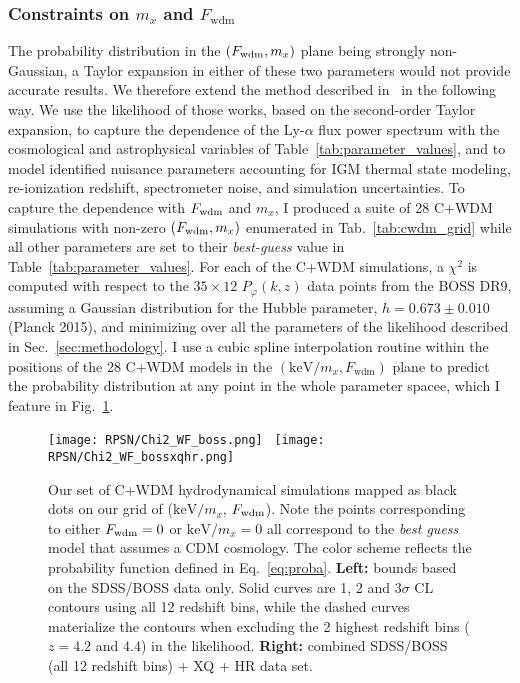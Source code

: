\subsubsection{Constraints on $m_x$ and $F_{\mathrm{wdm}}$}

The probability distribution in the $(F_{\rm{wdm}},m_x)$ plane  being strongly non-Gaussian, a Taylor expansion in either of these two parameters would not provide  accurate results. We therefore extend the method described in~\cite{Borde2014, Palanque2015a, Palanque2015b, Baur16} in the following way. We use the likelihood of those works, based on the second-order Taylor expansion, to capture the dependence  of the Ly-$\alpha$ flux power spectrum with the cosmological and astrophysical variables of Table~\ref{tab:parameter_values}, and to model identified nuisance parameters accounting for IGM thermal state modeling, re-ionization redshift, spectrometer noise, and simulation uncertainties. 
To capture the dependence with $F_{\rm{wdm}}$ and $m_x$, I produced a suite of 28 C+WDM simulations with non-zero $(F_{\rm{wdm}},m_x)$ enumerated in Tab.~\ref{tab:cwdm_grid} while all other parameters are set to their \textit{best-guess} value in Table~\ref{tab:parameter_values}. 
For each of the C+WDM simulations, a $\chi^2$ is computed with respect to the $35 \times 12$ $P_\varphi(k, z)$ data points from the BOSS DR9, assuming a Gaussian distribution for the Hubble parameter, $h=0.673 \pm 0.010$ (Planck 2015), and minimizing over all the parameters of the likelihood described in Sec.~\ref{sec:methodology}. I use a cubic spline interpolation routine within the positions of the 28 C+WDM models in the $\left( \mathrm{keV}/m_x, F_{\mathrm{wdm}} \right)$ plane to predict the probability distribution at any point in the whole parameter spacee, which I feature in Fig.~\ref{fig:chi2_WF}. \\

\begin{figure}
\begin{center}
\texttt{[image: RPSN/Chi2\_WF\_boss.png]}~%
\texttt{[image: RPSN/Chi2\_WF\_bossxqhr.png]}
\caption{Our set of C+WDM hydrodynamical simulations mapped as black dots on
    our grid of ($\mathrm{keV}/m_x$, $F_{\rm{wdm}}$). Note the points
    corresponding to either $F_{\rm{wdm}}=0$ or $\mathrm{keV}/m_x=0$ all
    correspond to the \textit{best guess} model that assumes a CDM
    cosmology. The color scheme reflects the probability function defined in
    Eq.~\ref{eq:proba}. \textbf{Left:} bounds based on the SDSS/BOSS data
    only. Solid curves are 1, 2 and 3$\sigma$ CL contours using all 12
    redshift bins, while the dashed curves materialize the contours when
    excluding the 2 highest redshift bins ($z=4.2$ and $4.4$) in the likelihood. \textbf{Right:}
    combined SDSS/BOSS (all 12 redshift bins) + XQ + HR data set.}
\label{fig:chi2_WF}
\end{center}
\end{figure}


